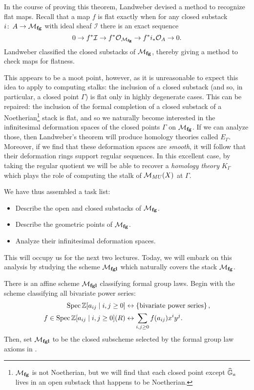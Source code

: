 \noindent In the course of proving this theorem, Landweber devised a method to recognize flat maps.  Recall that a map $f$ is flat exactly when for any closed substack $i\colon\thinspace A \to \mathcal{M}_{\mathbf{fg}}$ with ideal sheaf $\mathcal I$ there is an exact sequence \[0 \to f^* \mathcal I \to f^* \mathcal O_{\mathcal{M}_{\mathbf{fg}}} \to f^* i_* \mathcal O_A \to 0.\]  Landweber classified the closed substacks of $\mathcal{M}_{\mathbf{fg}}$, thereby giving a method to check maps for flatness.

This appears to be a moot point, however, as it is unreasonable to expect this idea to apply to computing stalks: the inclusion of a closed substack (and so, in particular, a closed point $\Gamma$) is flat only in highly degenerate cases.  This can be repaired: the inclusion of the formal completion of a closed substack of a Noetherian\footnote{$\mathcal{M}_{\mathbf{fg}}$ is not Noetherian, but we will find that each closed point except $\widehat{\mathbb G}_a$ lives in an open substack that happens to be Noetherian.} stack is flat, and so we naturally become interested in the infinitesimal deformation spaces of the closed points $\Gamma$ on $\mathcal{M}_{\mathbf{fg}}$.  If we can analyze those, then Landweber's theorem will produce homology theories called $E_\Gamma$.  Moreover, if we find that these deformation spaces are \emph{smooth}, it will follow that their deformation rings support regular sequences.  In this excellent case, by taking the regular quotient we will be able to recover a \emph{homology theory} $K_\Gamma$ which plays the role of computing the stalk of $\mathcal{M}_{MU}(X)$ at $\Gamma$.

We have thus assembled a task list:
\begin{itemize}
\item Describe the open and closed substacks of $\mathcal{M}_{\mathbf{fg}}$.
\item Describe the geometric points of $\mathcal{M}_{\mathbf{fg}}$.
\item Analyze their infinitesimal deformation spaces.
\end{itemize}
This will occupy us for the next two lectures.  Today, we will embark on this analysis by studying the scheme $\mathcal{M}_{\mathbf{fgl}}$ which naturally covers the stack $\mathcal{M}_{\mathbf{fg}}$.


\begin{definition}
There is an affine scheme $\mathcal{M}_{\mathbf{fgl}}$ classifying formal group laws.  Begin with the scheme classifying all bivariate power series:
\begin{align*}
\operatorname{Spec} \mathbb Z[a_{ij} \mid i, j \ge 0] & \leftrightarrow \left\{ \text{bivariate power series} \right\}, \\
f \in \operatorname{Spec}\mathbb Z[a_{ij} \mid i, j \ge 0](R) & \leftrightarrow \sum_{i, j \ge 0} f(a_{ij}) x^i y^j.
\end{align*}
Then, set $\mathcal{M}_{\mathbf{fgl}}$ to be the closed subscheme selected by the formal group law axioms in .
\end{definition}

